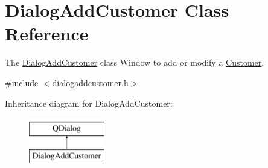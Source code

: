 \hypertarget{classDialogAddCustomer}{\section{Dialog\+Add\+Customer Class Reference}
\label{classDialogAddCustomer}
}


The \hyperlink{classDialogAddCustomer}{Dialog\+Add\+Customer} class Window to add or modify a \hyperlink{classCustomer}{Customer}.  




{\ttfamily \#include $<$dialogaddcustomer.\+h$>$}

Inheritance diagram for Dialog\+Add\+Customer\+:\begin{figure}[H]
\begin{center}
\leavevmode
\includegraphics[height=2.000000cm]{df/d01/classDialogAddCustomer}
\end{center}
\end{figure}
